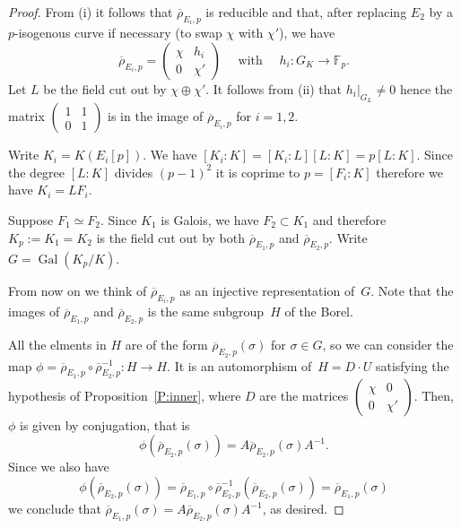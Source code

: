 \documentclass[12pt]{amsart}
\newcommand{\F}{\mathbb{F}}
\newcommand{\rhobar}{{\overline{\rho}}}
\DeclareMathOperator{\Gal}{Gal}
\numberwithin{equation}{section}
\theoremstyle{definition}
\theoremstyle{remark}
\begin{document}
\begin{proof} From (i) it follows that $\rhobar_{E_i,p}$ is reducible and that, after replacing $E_2$ by a $p$-isogenous curve if necessary (to swap 
$\chi$ with $\chi'$), 
we have 
\[
\rhobar_{E_i,p} =  \begin{pmatrix}
                            \chi & h_i \\
                            0 & \chi'
                            \end{pmatrix} \quad \text{ with } \quad  h_i : G_K \to \F_p.  
\]
Let $L$ be the field cut out 
by $\chi \oplus \chi'$. 
It follows from (ii) that $h_i|_{G_L} \neq 0$ 
hence the matrix $\left(\begin{smallmatrix}
                            1 & 1 \\
                            0 & 1
                            \end{smallmatrix} \right)$  
is in the image of $\rhobar_{E_i,p}$ for $i=1,2$.
                            
Write $K_i = K(E_i[p])$. 
We have $[K_i : K] = [K_i : L][L : K] = p [L : K]$. 
Since the degree $[L : K]$ divides $(p-1)^2$ it is coprime 
to $p = [F_i : K]$ therefore we have $K_i = L F_i$.

Suppose $F_1 \simeq F_2$. Since $K_1$ is Galois, we have $F_2 \subset K_1$ and therefore $K_p := K_1 = K_2$ is the field cut out by both
$\rhobar_{E_1,p}$ and $\rhobar_{E_2,p}$.
Write $G = \Gal(K_p / K)$. 

From now on we think of $\rhobar_{E_i,p}$ as an injective representation of~$G$. Note that the images of $\rhobar_{E_1,p}$ and $\rhobar_{E_2,p}$
is the same subgroup~$H$ of the Borel.

All the elments in $H$ are of the form $\rhobar_{E_2,p}(\sigma)$ for $\sigma \in G$, so we can consider the map $\phi = \rhobar_{E_1,p} \circ \rhobar_{E_2,p}^{-1} : H \to H$. It is an automorphism of~$H = D\cdot U$ satisfying the hypothesis of Proposition~\ref{P:inner}, where $D$ are 
the matrices $\left(\begin{smallmatrix}
                            \chi & 0 \\
                            0 & \chi'
                            \end{smallmatrix} \right)$.  
Then, $\phi$ is given by conjugation, that is
\[
 \phi(\rhobar_{E_2,p}(\sigma)) = A \rhobar_{E_2,p}(\sigma) A^{-1}.
\]
Since we also have
\[ 
\phi(\rhobar_{E_2,p}(\sigma)) 
=  \rhobar_{E_1,p} \circ \rhobar_{E_2,p}^{-1}(\rhobar_{E_2,p}(\sigma)) = \rhobar_{E_1,p}(\sigma)
\]
we conclude that $\rhobar_{E_1,p}(\sigma) = A \rhobar_{E_2,p}(\sigma) A^{-1}$, as desired.
\end{proof}
\end{document}

